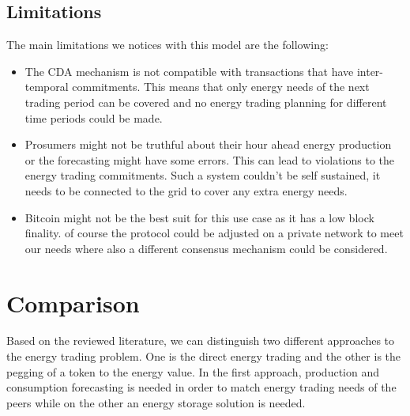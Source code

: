 \subsection{Limitations}
The main limitations we notices with this model are the following:
\begin{itemize}
    \item The CDA mechanism is not compatible with transactions that have inter-temporal commitments. This means that only energy needs of the next trading period can be covered
          and no energy trading planning for different time periods could be made.
    \item Prosumers might not be truthful about their hour ahead energy production or the forecasting might have some errors. This can lead to violations to the energy trading
          commitments. Such a system couldn't be self sustained, it needs to be connected to the grid to cover any extra energy needs.
    \item  Bitcoin might not be the best suit for this use case as it has a low block finality. of course the protocol could be adjusted on a private network to meet our needs
          where also a different consensus mechanism could be considered.
\end{itemize}

\section{Comparison}
\label{sec:comp}
Based on the reviewed literature, we can distinguish two different approaches to the energy trading problem.
One is the direct energy trading and the other is the pegging of a token to the energy value.
In the first approach, production and consumption forecasting is needed in order to match
energy trading needs of the peers while on the other an energy storage solution is needed.

